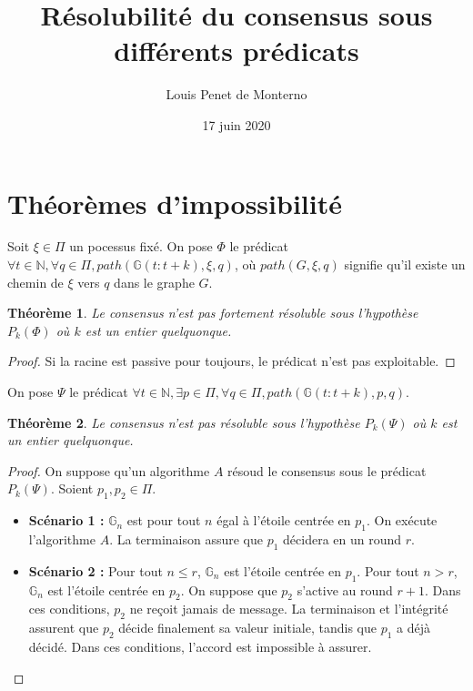 \documentclass{article}
\title{Résolubilité du consensus sous différents prédicats}
\date{17 juin 2020}
\author{Louis Penet de Monterno}
\newtheorem{theorem}{Théorème}
\begin{document}
\maketitle

\section{Théorèmes d'impossibilité}

Soit $\xi \in \Pi$ un pocessus fixé.
On pose $\Phi$ le prédicat $\forall t \in \mathds{N}, \forall q \in \Pi, path(\mathds{G}(t : t+k), \xi, q)$, où $path(G, \xi, q)$ signifie qu'il existe un chemin de $\xi$ vers $q$ dans le graphe $G$.

\begin{theorem}
	Le consensus n'est pas fortement résoluble sous l'hypothèse $P_k(\Phi)$ où $k$ est un entier quelquonque.
\end{theorem}
\begin{proof}
	Si la racine est passive pour toujours, le prédicat n'est pas exploitable.
\end{proof}

On pose $\Psi$ le prédicat $\forall t \in \mathds{N}, \exists p \in \Pi, \forall q \in \Pi, path(\mathds{G}(t : t+k), p, q)$.
\begin{theorem}
	Le consensus n'est pas résoluble sous l'hypothèse $P_k(\Psi)$ où $k$ est un entier quelquonque.
\end{theorem}
\begin{proof}
	On suppose qu'un algorithme $A$ résoud le consensus sous le prédicat $P_k(\Psi)$. Soient $p_1, p_2 \in \Pi$.
	\begin{itemize}

		\item \textbf{Scénario 1 :} $\mathds{G}_n$ est pour tout $n$ égal à l'étoile centrée en $p_1$. On exécute l'algorithme $A$. La terminaison assure que $p_1$ décidera en un round $r$.
		\item \textbf{Scénario 2 :} Pour tout $n \leq r$, $\mathds{G}_n$ est l'étoile centrée en $p_1$. Pour tout $n > r$, $\mathds{G}_n$ est l'étoile centrée en $p_2$. On suppose que $p_2$
			s'active au round $r+1$. Dans ces conditions, $p_2$ ne reçoit jamais de message. La terminaison et l'intégrité assurent que $p_2$ décide finalement sa valeur initiale,
			tandis que $p_1$ a déjà décidé. Dans ces conditions, l'accord est impossible à assurer.

	\end{itemize}
\end{proof}
\end{document}
